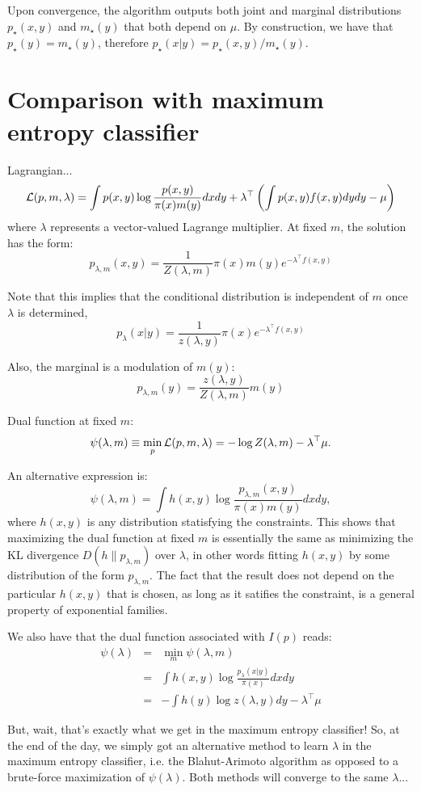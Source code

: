 \documentclass[english]{scrartcl}
\begin{document}
Upon convergence, the algorithm outputs both joint and marginal
distributions $p_{\star}(x,y)$ and $m_{\star}(y)$ that both depend on
$\mu$. By construction, we have that $p_{\star}(y) = m_{\star}(y)$,
therefore $p_\star(x|y)=p_{\star}(x,y)/m_{\star}(y)$.


\section{Comparison with maximum entropy classifier}

Lagrangian...
$$
{\cal L}(p,m,\lambda)
= 
\int p(x,y) \log \frac{p(x,y)}{\pi(x)m(y)} dxdy
+
\lambda^\top \left( 
\int p(x,y) f(x,y) dydy - \mu 
\right)
$$ where $\lambda$ represents a vector-valued Lagrange multiplier. At
fixed $m$, the solution has the form:
$$
p_{\lambda,m}(x,y) = \frac{1}{Z(\lambda,m)}
\pi(x) m(y) e^{-\lambda^\top f(x,y)} 
$$

Note that this implies that the conditional distribution is
independent of $m$ once $\lambda$ is determined,
$$
p_\lambda(x|y) = \frac{1}{z(\lambda,y)} \pi(x) e^{-\lambda^\top f(x,y)} 
$$

Also, the marginal is a modulation of $m(y)$:
$$
p_{\lambda,m}(y) = \frac{z(\lambda,y)}{Z(\lambda,m)} m(y)
$$

Dual function at fixed $m$:
$$
\psi(\lambda,m) 
\equiv \min_p {\cal L}(p,m,\lambda)
= 
- \log Z(\lambda,m) - \lambda^\top \mu
.
$$ 

An alternative expression is:
$$
\psi(\lambda, m)
= 
\int h(x,y) 
\log \frac{p_{\lambda,m}(x,y)}{\pi(x)m(y)} dxdy,
$$ where $h(x,y)$ is any distribution statisfying the
constraints. This shows that maximizing the dual function at fixed $m$
is essentially the same as minimizing the KL divergence
$D(h\|p_{\lambda,m})$ over $\lambda$, in other words fitting $h(x,y)$
by some distribution of the form $p_{\lambda,m}$. The fact that the
result does not depend on the particular $h(x,y)$ that is chosen, as
long as it satifies the constraint, is a general property of
exponential families.

We also have that the dual function associated with $I(p)$ reads:
\begin{eqnarray*}
\psi(\lambda) 
 & = & \min_m \psi(\lambda, m)\\
 & = & \int h(x,y) \log \frac{p_{\lambda}(x|y)}{\pi(x)} dxdy\\
 & = & -\int h(y) \log z(\lambda,y) dy - \lambda^\top \mu
\end{eqnarray*}

But, wait, that's exactly what we get in the maximum entropy
classifier! So, at the end of the day, we simply got an alternative
method to learn $\lambda$ in the maximum entropy classifier, i.e. the
Blahut-Arimoto algorithm as opposed to a brute-force maximization of
$\psi(\lambda)$. Both methods will converge to the same $\lambda$...
\end{document}
